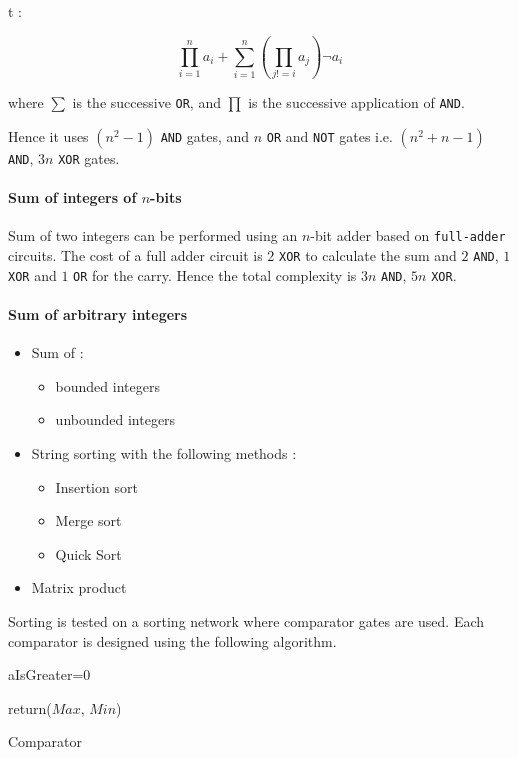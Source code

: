 \documentclass{acm_proc_article-sp}
\begin{document}
t : 

\[\prod_{i=1}^{n}{a_i}+\sum_{i=1}^{n}{(\prod_{j!=i}{a_j}) \neg a_i}\]

where $\sum$ is the successive \texttt{OR}, and $\prod$ is the successive application of \texttt{AND}.

Hence it uses $(n^2-1)$ \texttt{AND} gates, and $n$ \texttt{OR} and \texttt{NOT} gates i.e. $(n^2+n-1)$ \texttt{AND}, $3n$ \texttt{XOR} gates.
\paragraph{Sum of integers of $n$-bits} Sum of two integers can be performed using an $n$-bit adder based on \texttt{full-adder} circuits. The cost of a full adder circuit is $2$ \texttt{XOR} to calculate the sum and $2$ \texttt{AND}, $1$ \texttt{XOR} and $1$ \texttt{OR} for the carry. Hence the total complexity is $3n$ \texttt{AND}, $5n$ \texttt{XOR}. 
\paragraph{Sum of arbitrary integers}

\begin{itemize}
\item Sum of : 
	\begin{itemize}
	\item  bounded integers
	\item unbounded integers
 	\end{itemize}
\item String sorting with the following methods :
	\begin{itemize}
	\item Insertion sort
	\item Merge sort
	\item Quick Sort
	\end{itemize}
\item Matrix product
\end{itemize}


Sorting is tested on a sorting network where comparator gates are used. Each comparator is designed using the following algorithm. 

\linesnumbered
\begin{algorithm}[H]
 \SetVline
 aIsGreater=$0$\;



return($Max$, $Min$)
 \caption{Comparator\label{Code:algo}}
\end{algorithm}
\end{document}

